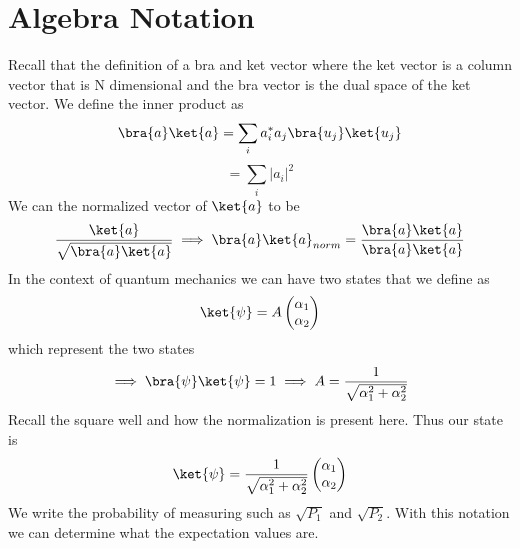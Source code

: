 \section{Algebra Notation}
Recall that the definition of a bra and ket vector where 
the ket vector is a column vector that is N dimensional and the bra vector is the dual 
space of the ket vector. We define the inner product as 
\[
    \bra{a}\ket{a}  = \sum_{i} a_i^* a_j \bra{u_j}\ket{u_j} 
\]  
\[
    = \sum_{i} \vert a_i \vert ^{2} 
\]
We can the normalized vector of \(\ket{a}\) to be 
\[
    \frac{\ket{a}}{\sqrt{\bra{a}\ket{a}} } \implies  \bra{a}\ket{a}_{norm} = \frac{\bra{a}\ket{a}}{\bra{a}\ket{a}}
\] 
In the context of quantum mechanics we can have two states that we define as 
\[
    \ket{\psi } =A \begin{pmatrix}
         \alpha_1 \\
          \alpha_2\\
    \end{pmatrix}
\] which represent the two states 
\[
    \implies \bra{\psi} \ket{\psi} = 1 \implies A = \frac{1}{\sqrt{\alpha_1 ^{2} +   \alpha_{2}^{2}  } }
\]
Recall the square well and how the normalization is present here. Thus our state is 
\[
    \ket{\psi} = \frac{1}{\sqrt{\alpha_1 ^{2} + \alpha_2 ^{2} } } \begin{pmatrix}
         \alpha_1 \\
          \alpha_2\\
    \end{pmatrix}
\]
We write the probability of measuring such as \(\sqrt{P_1} \) and \(\sqrt{P_2} \). With this notation we can determine 
what the expectation values are. 
